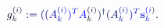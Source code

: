 \documentclass[12pt]{article}
\begin{document}
\makeatletter
\renewcommand*{\@textcolor}[3]{%
  \protect\leavevmode
  \begingroup
    \color#1{#2}#3%
  \endgroup
}
\makeatother
\begin{displaymath}
\mathcolor[RGB]{0,0,15}{g} _ { \mathcolor[RGB]{0,0,30}{k} } ^ { \mathcolor[RGB]{0,0,45}{(} \mathcolor[RGB]{0,0,60}{i} \mathcolor[RGB]{0,0,75}{)} } \mathcolor[RGB]{0,0,90}{:} \mathcolor[RGB]{0,0,105}{=} \mathcolor[RGB]{0,0,120}{(} \mathcolor[RGB]{0,0,135}{(} \mathcolor[RGB]{0,0,150}{A} _ { \mathcolor[RGB]{0,0,165}{k} } ^ { \mathcolor[RGB]{0,0,180}{(} \mathcolor[RGB]{0,0,195}{i} \mathcolor[RGB]{0,0,210}{)} } \mathcolor[RGB]{0,0,225}{)} ^ { \mathcolor[RGB]{0,0,240}{T} } \mathcolor[RGB]{0,0,255}{A} _ { \mathcolor[RGB]{0,15,0}{k} } ^ { \mathcolor[RGB]{0,15,15}{(} \mathcolor[RGB]{0,15,30}{i} \mathcolor[RGB]{0,15,45}{)} } \mathcolor[RGB]{0,15,60}{)} ^ { \mathcolor[RGB]{0,15,75}{\dagger} } \mathcolor[RGB]{0,15,90}{(} \mathcolor[RGB]{0,15,105}{A} _ { \mathcolor[RGB]{0,15,120}{k} } ^ { \mathcolor[RGB]{0,15,135}{(} \mathcolor[RGB]{0,15,150}{i} \mathcolor[RGB]{0,15,165}{)} } \mathcolor[RGB]{0,15,180}{)} ^ { \mathcolor[RGB]{0,15,195}{T} } { \mathbf { \mathcolor[RGB]{0,15,210}{s} } } _ { \mathcolor[RGB]{0,15,225}{k} } ^ { \mathcolor[RGB]{0,15,240}{(} \mathcolor[RGB]{0,15,255}{i} \mathcolor[RGB]{0,30,0}{)} } \mathcolor[RGB]{0,30,15}{.}
\end{displaymath}
\end{document}

